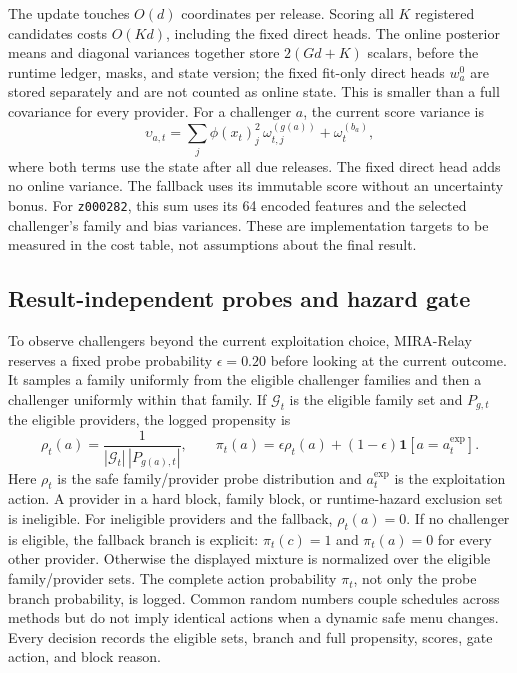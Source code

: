 \documentclass[sigconf,anonymous]{aamas}
\begin{document}
The update touches $O(d)$ coordinates per release. Scoring all $K$ registered candidates costs
$O(Kd)$, including the fixed direct heads. The online posterior means and diagonal variances
together store $2(Gd+K)$ scalars, before the runtime ledger, masks, and state version; the fixed
fit-only direct heads $w_a^0$ are stored separately and are not counted as online state. This is
smaller than a full covariance for every provider.
For a challenger $a$, the current score variance is
$$
\upsilon_{a,t}=\sum_j \phi(x_t)_j^{2}\,\omega^{(g(a))}_{t,j}+\omega^{(b_a)}_t,
$$
where both terms use the state after all due releases. The fixed direct head adds no online variance. The fallback uses its immutable score without an uncertainty bonus. For \texttt{z000282}, this sum uses its 64 encoded features and the selected challenger's family and bias variances.
These are implementation targets to be measured in the cost table, not assumptions about the final result.

\subsection{Result-independent probes and hazard gate}
To observe challengers beyond the current exploitation choice, MIRA-Relay reserves a fixed probe probability $\epsilon=0.20$ before looking at the current outcome. It samples a family uniformly from the eligible challenger families and then a challenger uniformly within that family. If $\mathcal{G}_t$ is the eligible family set and $P_{g,t}$ the eligible providers, the logged propensity is
$$
\rho_t(a)=\frac{1}{|\mathcal{G}_t|\,|P_{g(a),t}|},\qquad
\pi_t(a)=\epsilon \rho_t(a)+(1-\epsilon)\mathbf{1}[a=a_t^{\mathrm{exp}}].
$$
Here $\rho_t$ is the safe family/provider probe distribution and $a_t^{\mathrm{exp}}$ is the exploitation action. A provider in a hard block, family block, or runtime-hazard exclusion set is ineligible. For ineligible providers and the fallback, $\rho_t(a)=0$. If no challenger is eligible, the fallback branch is explicit: $\pi_t(c)=1$ and $\pi_t(a)=0$ for every other provider. Otherwise the displayed mixture is normalized over the eligible family/provider sets. The complete action probability $\pi_t$, not only the probe branch probability, is logged. Common random numbers couple schedules across methods but do not imply identical actions when a dynamic safe menu changes. Every decision records the eligible sets, branch and full propensity, scores, gate action, and block reason.
\end{document}
